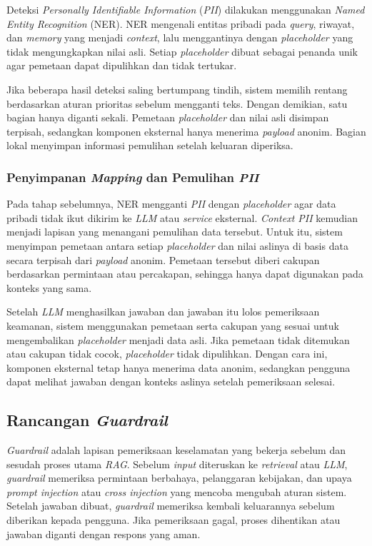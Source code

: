 Deteksi \emph{Personally Identifiable Information} (\emph{PII}) dilakukan menggunakan
\emph{Named Entity Recognition} (NER). NER mengenali entitas pribadi pada \emph{query},
riwayat, dan \emph{memory} yang menjadi \emph{context}, lalu menggantinya dengan
\emph{placeholder} yang tidak mengungkapkan nilai asli. Setiap \emph{placeholder}
dibuat sebagai penanda unik agar pemetaan dapat dipulihkan dan tidak tertukar.

Jika beberapa hasil deteksi saling bertumpang tindih, sistem memilih rentang berdasarkan
aturan prioritas sebelum mengganti teks. Dengan demikian, satu bagian hanya diganti sekali.
Pemetaan \emph{placeholder} dan nilai asli disimpan terpisah, sedangkan komponen eksternal
hanya menerima \emph{payload} anonim. Bagian lokal menyimpan informasi pemulihan setelah
keluaran diperiksa.

\subsubsection{Penyimpanan \emph{Mapping} dan Pemulihan \emph{PII}}
\label{subsubsec:mapping-dan-pemulihan-pii}

Pada tahap sebelumnya, NER mengganti \emph{PII} dengan \emph{placeholder} agar data pribadi
tidak ikut dikirim ke \emph{LLM} atau \emph{service} eksternal. \emph{Context PII} kemudian menjadi
lapisan yang menangani pemulihan data tersebut. Untuk itu, sistem menyimpan pemetaan
antara setiap \emph{placeholder} dan nilai aslinya di basis data secara terpisah dari
\emph{payload} anonim. Pemetaan tersebut diberi cakupan berdasarkan permintaan
atau percakapan, sehingga hanya dapat digunakan pada konteks yang sama.

Setelah \emph{LLM} menghasilkan jawaban dan jawaban itu lolos pemeriksaan keamanan, sistem
menggunakan pemetaan serta cakupan yang sesuai untuk mengembalikan \emph{placeholder}
menjadi data asli. Jika pemetaan tidak ditemukan atau cakupan tidak cocok,
\emph{placeholder} tidak dipulihkan. Dengan cara ini, komponen eksternal tetap hanya
menerima data anonim, sedangkan pengguna dapat melihat jawaban dengan konteks aslinya
setelah pemeriksaan selesai.

\subsection{Rancangan \emph{Guardrail}}
\label{subsec:solusi-guardrail}

\emph{Guardrail} adalah lapisan pemeriksaan keselamatan yang bekerja sebelum dan sesudah
proses utama \emph{RAG}. Sebelum \emph{input} diteruskan ke \emph{retrieval} atau \emph{LLM},
\emph{guardrail} memeriksa permintaan berbahaya, pelanggaran kebijakan, dan upaya
\emph{prompt injection} atau \emph{cross injection} yang mencoba mengubah aturan sistem.
Setelah jawaban dibuat, \emph{guardrail} memeriksa kembali keluarannya sebelum diberikan
kepada pengguna. Jika pemeriksaan gagal, proses dihentikan atau jawaban diganti dengan
respons yang aman.

